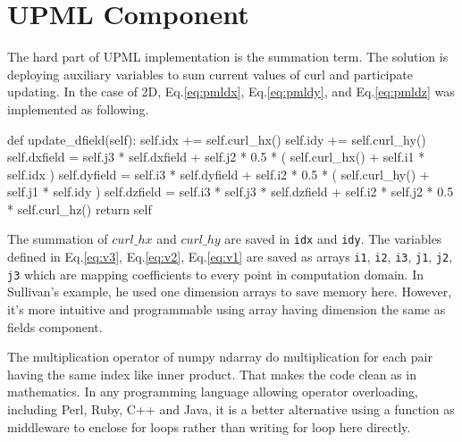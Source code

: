 \section{UPML Component}
The hard part of UPML implementation is the summation term. The solution is deploying auxiliary variables to sum current
values of curl and participate updating. In the case of 2D, Eq.\ref{eq:pmldx}, Eq.\ref{eq:pmldy}, and Eq.\ref{eq:pmldz}
was implemented as following.
\begin{code}
    def update_dfield(self):
        self.idx += self.curl_hx()
        self.idy += self.curl_hy()
        self.dxfield = self.j3 * self.dxfield 
                     + self.j2 * 0.5 * ( self.curl_hx() + self.i1 * self.idx )
        self.dyfield = self.i3 * self.dyfield 
                     + self.i2 * 0.5 * ( self.curl_hy() + self.j1 * self.idy )
        self.dzfield = self.i3 * self.j3 * self.dzfield 
                     + self.i2 * self.j2 * 0.5 * self.curl_hz()
        return self
\end{code}
The summation of $curl\_hx$ and $curl\_hy$ are saved in \texttt{idx} and \texttt{idy}. The variables defined in
Eq.\ref{eq:v3}, Eq.\ref{eq:v2}, Eq.\ref{eq:v1} are saved as arrays \texttt{i1}, \texttt{i2}, \texttt{i3}, \texttt{j1},
\texttt{j2}, \texttt{j3} which are mapping coefficients to every point in computation domain. In Sullivan's example, he
used one dimension arrays to save memory here. However, it's more intuitive and programmable using array having
dimension the same as fields component.

The multiplication operator of numpy ndarray do multiplication for each pair having the same index like inner
product. That makes the code clean as in mathematics. In any programming language allowing operator overloading,
including Perl, Ruby, C++ and Java, it is a better alternative using a function as middleware to enclose for loops
rather than writing for loop here directly.
